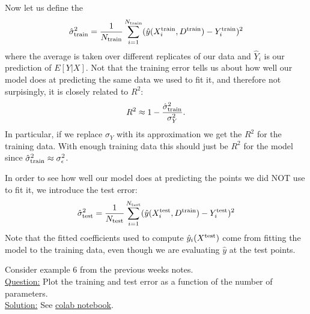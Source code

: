 Now let us define the 
\begin{equation*}
\hat{\sigma}_{\rm train}^2=  \frac{1}{N_{\rm train}}\sum_{i=1}^{N_{\rm train}}(\hat{y}(X_i^{\rm train},D^{\rm train}) - Y_i^{\rm train})^2
\end{equation*}
where the average is taken over different replicates of our data and $\hat{Y}_i$ is our prediction of $E[Y|X]$. Not that the training error tells us about how well our model does at predicting the same data we used to fit it, and therefore not surpisingly, it is closely related to $R^2$:
\begin{equation*}
R^2 \approx 1 - \frac{\hat{\sigma}_{\rm train}^2}{\sigma_Y^2}.
\end{equation*}
In particular, if we replace $\sigma_Y$ with its approximation we get the $R^2$ for the training data. With enough training data this should just be $R^2$ for the model since $\hat{\sigma}_{\rm train}^2 \approx \sigma_{\epsilon}^2$. 


In order to see how well our model does at predicting the points we did NOT use to fit it, we introduce the test error: 
\begin{equation*}
\hat{\sigma}_{\rm test}^2=  \frac{1}{N_{\rm test}}\sum_{i=1}^{N_{\rm test}}(\hat{y}(X_i^{\rm test},D^{\rm train}) - Y_i^{\rm test})^2
\end{equation*}
Note that the fitted coefficients used to compute $\hat{y}_i(X^{\rm test})$ come from fitting the model to the training data, even though we are evaluating $\hat{y}$ at the test points. 

\begin{example}\label{ex:polycrossval}
Consider example 6 from the previous weeks notes. \\

\noindent
\underline{Question:} Plot the training and test error as a function of the number of parameters. \\

\noindent
\underline{Solution:}  See \href{https://colab.research.google.com/drive/1EYcMviowfsnsVe7vsUKlyzkNsddUiTau?usp=sharing}{colab notebook}.
\end{example}

